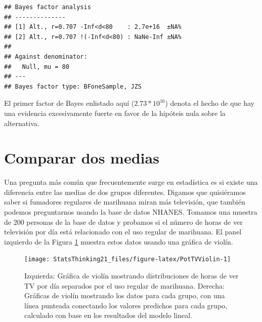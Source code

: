 \documentclass[
  12pt,
]{book}
\newenvironment{Shaded}{\begin{snugshade}}{\end{snugshade}}
\newcommand{\AttributeTok}[1]{\textcolor[rgb]{0.77,0.63,0.00}{#1}}
\newcommand{\ConstantTok}[1]{\textcolor[rgb]{0.00,0.00,0.00}{#1}}
\newcommand{\DecValTok}[1]{\textcolor[rgb]{0.00,0.00,0.81}{#1}}
\newcommand{\FunctionTok}[1]{\textcolor[rgb]{0.00,0.00,0.00}{#1}}
\newcommand{\NormalTok}[1]{#1}
\newcommand{\SpecialCharTok}[1]{\textcolor[rgb]{0.00,0.00,0.00}{#1}}
\begin{document}
\begin{Shaded}
\end{Shaded}

\begin{verbatim}
## Bayes factor analysis
## --------------
## [1] Alt., r=0.707 -Inf<d<80    : 2.7e+16  ±NA%
## [2] Alt., r=0.707 !(-Inf<d<80) : NaNe-Inf ±NA%
## 
## Against denominator:
##   Null, mu = 80 
## ---
## Bayes factor type: BFoneSample, JZS
\end{verbatim}

El primer factor de Bayes enlistado aquí (\(2.73 * 10^{16}\)) denota el hecho de que hay una evidencia excesivamente fuerte en favor de la hipóteis nula sobre la alternativa.

\hypertarget{comparing-two-means}{%
\section{Comparar dos medias}\label{comparing-two-means}}

Una pregunta más común que frecuentemente surge en estadística es si existe una diferencia entre las medias de dos grupos diferentes. Digamos que quisiéramos saber si fumadores regulares de marihuana miran más televisión, que también podemos preguntarnos usando la base de datos NHANES. Tomamos una muestra de 200 personas de la base de datos y probamos si el número de horas de ver televisión por día está relacionado con el uso regular de marihuana. El panel izquierdo de la Figura \ref{fig:PotTVViolin} muestra estos datos usando una gráfica de violín.

\begin{figure}
\texttt{[image: StatsThinking21\_files/figure-latex/PotTVViolin-1]} \caption{Izquierda: Gráfica de violín mostrando distribuciones de horas de ver TV por día separados por el uso regular de marihuana. Derecha: Gráficas de violín mostrando los datos para cada grupo, con una línea punteada conectando los valores predichos para cada grupo, calculado con base en los resultados del modelo lineal.}\label{fig:PotTVViolin}
\end{figure}
\end{document}
